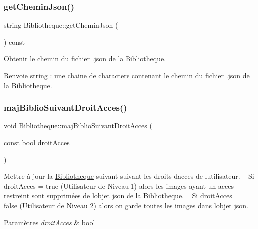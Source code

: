 \subsubsection{\texorpdfstring{get\+Chemin\+Json()}{getCheminJson()}}
{\footnotesize\ttfamily string Bibliotheque\+::get\+Chemin\+Json (\begin{DoxyParamCaption}{ }\end{DoxyParamCaption}) const}



Obtenir le chemin du fichier .json de la \hyperlink{classBibliotheque}{Bibliotheque}. 

\begin{DoxyReturn}{Renvoie}
string \+: une chaine de charactere contenant le chemin du fichier .json de la \hyperlink{classBibliotheque}{Bibliotheque}. 
\end{DoxyReturn}
\mbox{\label{classBibliotheque_a61778c23eb938c95b4de4306c14fe754}} 
\subsubsection{\texorpdfstring{maj\+Biblio\+Suivant\+Droit\+Acces()}{majBiblioSuivantDroitAcces()}}
{\footnotesize\ttfamily void Bibliotheque\+::maj\+Biblio\+Suivant\+Droit\+Acces (\begin{DoxyParamCaption}\item[{const bool}]{droit\+Acces }\end{DoxyParamCaption})}



Mettre à jour la \hyperlink{classBibliotheque}{Bibliotheque} suivant suivant les droits d\textquotesingle{}acces de l\textquotesingle{}utilisateur. ~\newline
 Si droit\+Acces = true (Utilisateur de Niveau 1) alors les images ayant un acces restreint sont supprimées de l\textquotesingle{}objet json de la \hyperlink{classBibliotheque}{Bibliotheque}. ~\newline
 Si droit\+Acces = false (Utilisateur de Niveau 2) alors on garde toutes les images dans l\textquotesingle{}objet json. 


\begin{DoxyParams}{Paramètres}
{\em droit\+Acces} & bool \\
\hline
\end{DoxyParams}
\mbox{\label{classBibliotheque_abaf79da5c656d7cccb14b3c3a4b542f6}} 
